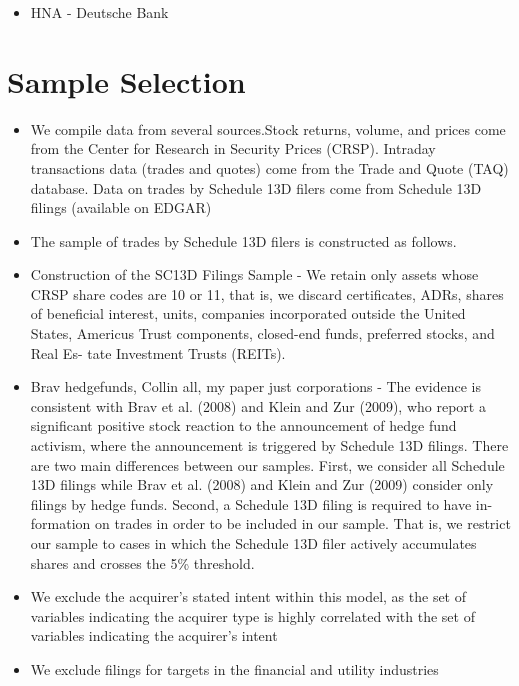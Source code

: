 \documentclass[12pt]{article}
\begin{document}
    \begin{itemize}
        \item HNA - Deutsche Bank
    \end{itemize}

\section{Sample Selection}

    \begin{itemize}
        \item We compile data from several sources.Stock returns, volume, and prices come from the Center for Research in Security Prices (CRSP). Intraday transactions data (trades and quotes) come from the Trade and Quote (TAQ) database. Data on trades by Schedule 13D filers come from Schedule 13D filings (available on EDGAR) \citep{Collin-Dufresne2015}
        \item The sample of trades by Schedule 13D filers is constructed as follows.\citep{Collin-Dufresne2015}
        \item Construction of the SC13D Filings Sample - We retain only assets whose CRSP share codes are 10 or 11, that is, we discard certificates, ADRs, shares of beneficial interest, units, companies incorporated outside the United States, Americus Trust components, closed-end funds, preferred stocks, and Real Es- tate Investment Trusts (REITs).\citep{Collin-Dufresne2015}
        \item Brav hedgefunds, Collin all, my paper just corporations - The evidence is consistent with Brav et al. (2008) and Klein and Zur (2009), who report a significant positive stock reaction to the announcement of hedge fund activism, where the announcement is triggered by Schedule 13D filings. There are two main differences between our samples. First, we consider all Schedule 13D filings while Brav et al. (2008) and Klein and Zur (2009) consider only filings by hedge funds. Second, a Schedule 13D filing is required to have in- formation on trades in order to be included in our sample. That is, we restrict our sample to cases in which the Schedule 13D filer actively accumulates shares and crosses the 5\% threshold.\citep{Collin-Dufresne2015}
        \item We exclude the acquirer’s stated intent within this model, as the set of variables indicating the acquirer type is highly correlated with the set of variables indicating the acquirer’s intent \citep{Brigida2012}
        \item We exclude filings for targets in the financial and utility industries \citep{Brigida2012}

\end{itemize}
\end{document}
